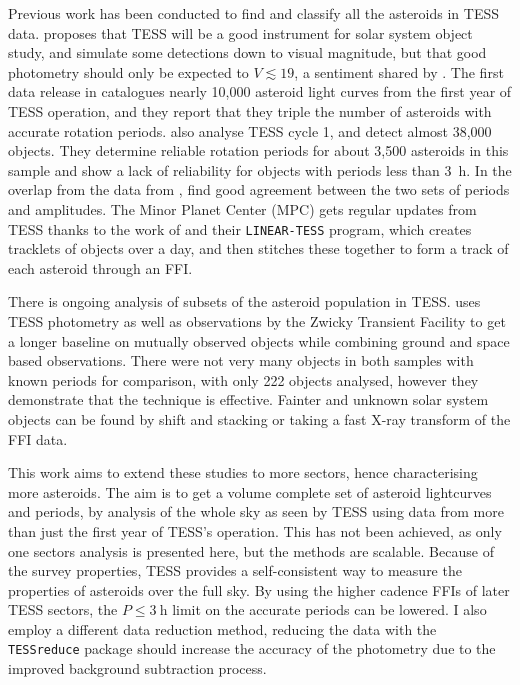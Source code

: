 \documentclass{UCreport}
\begin{document}
Previous work has been conducted to find and classify all the asteroids in TESS data.
\citet{Pal2018} proposes that TESS will be a good instrument for solar system object study, and simulate some detections down to  visual magnitude, but that good photometry should only be expected to $V \lesssim 19$, a sentiment shared by \citet{Wong2019}.
The first data release in \citet{Pal2020} catalogues nearly 10,000 asteroid light curves from the first year of TESS operation, and they report that they triple the number of asteroids with accurate rotation periods.
\citet{McNeill2023} also analyse TESS cycle 1, and detect almost 38,000 objects.
They determine reliable rotation periods for about 3,500 asteroids in this sample and show a lack of reliability for objects with periods less than \qty{3}{\hour}.
In the overlap from the data from \citet{Pal2020}, \citeauthor{McNeill2023} find good agreement between the two sets of periods and amplitudes.
The Minor Planet Center (MPC) gets regular updates from TESS thanks to the work of \citet{Woods2021} and their \texttt{LINEAR-TESS} program, which creates tracklets of objects over a day, and then stitches these together to form a track of each asteroid through an FFI.

There is ongoing analysis of subsets of the asteroid population in TESS.
\citet{Gowanlock2024} uses TESS photometry as well as  observations by the Zwicky Transient Facility \citep[ZTF, ][]{Bellm2018} to get a longer baseline on mutually observed objects while combining ground and space based observations.
There were not very many objects in both samples with known periods for comparison, with only 222 objects analysed, however they demonstrate that the technique is effective.
Fainter and unknown solar system objects can be found by shift and stacking \citep{Holman2019, Payne2019,Rice2020} or taking a fast X-ray transform \citep{Nguyen2024} of the FFI data.

This work aims to extend these studies to more sectors, hence characterising more asteroids.
The aim is to get a volume complete set of asteroid lightcurves and periods, by analysis of the whole sky as seen by TESS using data from more than just the first year of TESS's operation.
This has not been achieved, as only one sectors analysis is presented here, but the methods are scalable.
Because of the survey properties, TESS provides a self-consistent way to measure the properties of asteroids over the full sky.
By using the higher cadence FFIs of later TESS sectors, the $P\leq\qty{3}{\hour}$ limit on the accurate periods \citep[as found by ][]{McNeill2023} can be lowered.
I also employ a different data reduction method, reducing the data with the \texttt{TESSreduce} package \citep{Ridden-Harper2021} should increase the accuracy of the photometry due to the improved background subtraction process.
\end{document}
